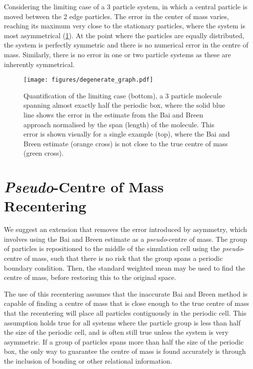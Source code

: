 \documentclass[reprint,superscriptaddress,nobibnotes,amsmath,amssymb,aip]{revtex4-2}
\begin{document}
Considering the limiting case of a 3 particle system, in which a central particle is moved between the 2 edge particles.
The error in the center of mass varies, reaching its maximum very close to the stationary particles, where the system is most asymmetrical (\cref{fig:error_quantification}). 
At the point where the particles are equally distributed, the system is perfectly symmetric and there is no numerical error in the centre of mass. 
Similarly, there is no error in one or two particle systems as these are inherently symmetrical. 
%
\begin{figure}
    \centering
    \texttt{[image: figures/degenerate\_graph.pdf]}
    \caption{Quantification of the limiting case (bottom), a 3 particle molecule spanning almost exactly half the periodic box, where the solid blue line shows the error in the estimate from the Bai and Breen approach normalised by the span (length) of the molecule.
    This error is shown visually for a single example (top), where the Bai and Breen estimate (orange cross) is not close to the true centre of mass (green cross).}
    \label{fig:error_quantification}
\end{figure}
%

\section{\emph{Pseudo}-Centre of Mass Recentering}

We suggest an extension that removes the error introduced by asymmetry, which involves using the Bai and Breen estimate as a \emph{pseudo}-centre of mass. 
The group of particles is repositioned to the middle of the simulation cell using the \emph{pseudo}-centre of mass, such that there is no risk that the group spans a periodic boundary condition. 
Then, the standard weighted mean may be used to find the centre of mass, before restoring this to the original space. 

The use of this recentering assumes that the inaccurate Bai and Breen method is capable of finding a centre of mass that is close enough to the true centre of mass that the recentering will place all particles contiguously in the periodic cell. 
This assumption holds true for all systems where the particle group is less than half the size of the periodic cell, and is often still true unless the system is very asymmetric. 
If a group of particles spans more than half the size of the periodic box, the only way to guarantee the centre of mass is found accurately is through the inclusion of bonding or other relational information. 
\end{document}
